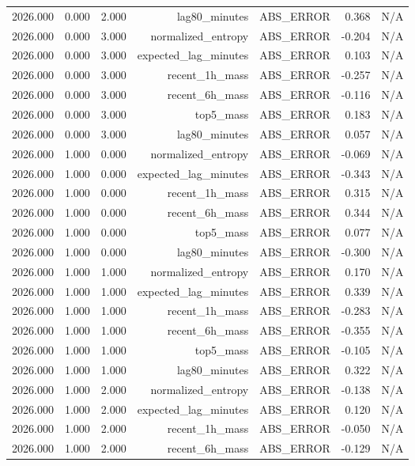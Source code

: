 \begin{table}[h!]
\begin{tabular}{lrrrrrr}
2026.000 & 0.000 & 2.000 & lag80\_minutes & ABS\_ERROR & 0.368 & N/A \\
2026.000 & 0.000 & 3.000 & normalized\_entropy & ABS\_ERROR & -0.204 & N/A \\
2026.000 & 0.000 & 3.000 & expected\_lag\_minutes & ABS\_ERROR & 0.103 & N/A \\
2026.000 & 0.000 & 3.000 & recent\_1h\_mass & ABS\_ERROR & -0.257 & N/A \\
2026.000 & 0.000 & 3.000 & recent\_6h\_mass & ABS\_ERROR & -0.116 & N/A \\
2026.000 & 0.000 & 3.000 & top5\_mass & ABS\_ERROR & 0.183 & N/A \\
2026.000 & 0.000 & 3.000 & lag80\_minutes & ABS\_ERROR & 0.057 & N/A \\
2026.000 & 1.000 & 0.000 & normalized\_entropy & ABS\_ERROR & -0.069 & N/A \\
2026.000 & 1.000 & 0.000 & expected\_lag\_minutes & ABS\_ERROR & -0.343 & N/A \\
2026.000 & 1.000 & 0.000 & recent\_1h\_mass & ABS\_ERROR & 0.315 & N/A \\
2026.000 & 1.000 & 0.000 & recent\_6h\_mass & ABS\_ERROR & 0.344 & N/A \\
2026.000 & 1.000 & 0.000 & top5\_mass & ABS\_ERROR & 0.077 & N/A \\
2026.000 & 1.000 & 0.000 & lag80\_minutes & ABS\_ERROR & -0.300 & N/A \\
2026.000 & 1.000 & 1.000 & normalized\_entropy & ABS\_ERROR & 0.170 & N/A \\
2026.000 & 1.000 & 1.000 & expected\_lag\_minutes & ABS\_ERROR & 0.339 & N/A \\
2026.000 & 1.000 & 1.000 & recent\_1h\_mass & ABS\_ERROR & -0.283 & N/A \\
2026.000 & 1.000 & 1.000 & recent\_6h\_mass & ABS\_ERROR & -0.355 & N/A \\
2026.000 & 1.000 & 1.000 & top5\_mass & ABS\_ERROR & -0.105 & N/A \\
2026.000 & 1.000 & 1.000 & lag80\_minutes & ABS\_ERROR & 0.322 & N/A \\
2026.000 & 1.000 & 2.000 & normalized\_entropy & ABS\_ERROR & -0.138 & N/A \\
2026.000 & 1.000 & 2.000 & expected\_lag\_minutes & ABS\_ERROR & 0.120 & N/A \\
2026.000 & 1.000 & 2.000 & recent\_1h\_mass & ABS\_ERROR & -0.050 & N/A \\
2026.000 & 1.000 & 2.000 & recent\_6h\_mass & ABS\_ERROR & -0.129 & N/A \\

\end{tabular}
\end{table}
